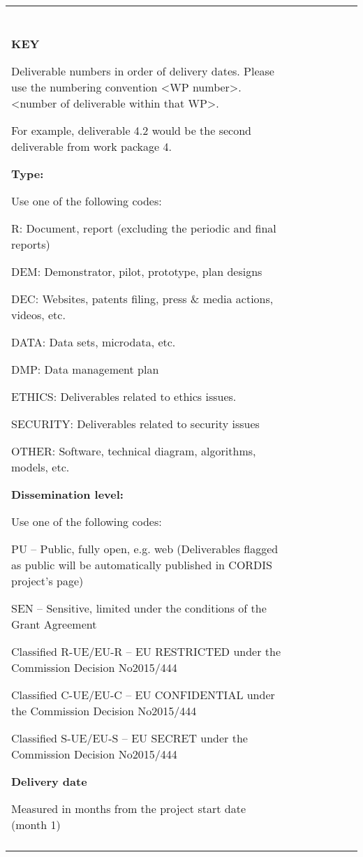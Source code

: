 \begin{longtable}[]{@{}
  >{\raggedright\arraybackslash}p{}
  >{\raggedright\arraybackslash}p{}
  >{\raggedright\arraybackslash}p{}
  >{\raggedright\arraybackslash}p{}
  >{\raggedright\arraybackslash}p{}
  >{\raggedright\arraybackslash}p{}
  >{\raggedright\arraybackslash}p{}@{}}
\toprule
\endhead
& & & & & & \\
& & & & & & \\
& & & & & & \\
& & & & & & \\
\textbf{KEY }

Deliverable numbers in order of delivery dates. Please use the numbering
convention \textless WP number\textgreater.\textless number of
deliverable within that WP\textgreater.

For example, deliverable 4.2 would be the second deliverable from work
package 4.

\textbf{Type: }

Use one of the following codes:

R: Document, report (excluding the periodic and final reports)

DEM: Demonstrator, pilot, prototype, plan designs

DEC: Websites, patents filing, press \& media actions, videos, etc.

DATA: Data sets, microdata, etc.

DMP: Data management plan

ETHICS: Deliverables related to ethics issues.

SECURITY: Deliverables related to security issues

OTHER: Software, technical diagram, algorithms, models, etc.

\textbf{Dissemination level: }

Use one of the following codes:

PU -- Public, fully open, e.g. web (Deliverables flagged as public will
be automatically published in CORDIS project's page)

SEN -- Sensitive, limited under the conditions of the Grant Agreement

Classified R-UE/EU-R -- EU RESTRICTED under the Commission Decision
No2015/444

Classified C-UE/EU-C -- EU CONFIDENTIAL under the Commission Decision
No2015/444

Classified S-UE/EU-S -- EU SECRET under the Commission Decision
No2015/444

\textbf{Delivery date}

Measured in months from the project start date (month 1) & & & & & & \\
& & & & & & \\
\bottomrule
\end{longtable}

